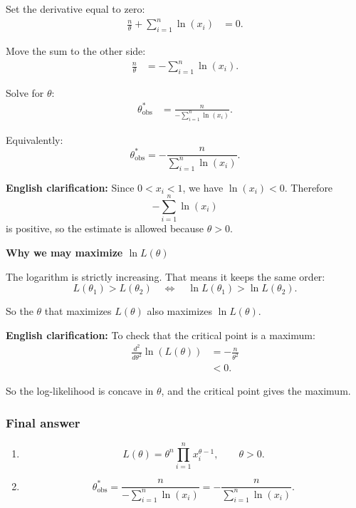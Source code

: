 \documentclass[10pt]{article}
\begin{document}
Set the derivative equal to zero:
\begin{align*}
\frac{n}{\theta}
+
\sum_{i=1}^{n}
\ln(x_i)
&=0.
\end{align*}

Move the sum to the other side:
\begin{align*}
\frac{n}{\theta}
&=
-
\sum_{i=1}^{n}
\ln(x_i).
\end{align*}

Solve for \(\theta\):
\begin{align*}
\theta^*_{\text{obs}}
&=
\frac{n}
{
-
\sum_{i=1}^{n}
\ln(x_i)
}.
\end{align*}

Equivalently:
\[
\theta^*_{\text{obs}}
=
-
\frac{n}
{
\sum_{i=1}^{n}
\ln(x_i)
}.
\]

\textbf{English clarification:}
Since \(0<x_i<1\), we have \(\ln(x_i)<0\).
Therefore
\[
-
\sum_{i=1}^{n}\ln(x_i)
\]
is positive, so the estimate is allowed because
\(\theta>0\).

\textbf{Why we may maximize \(\ln L(\theta)\)}

The logarithm is strictly increasing. That means it
keeps the same order:
\[
L(\theta_1)>L(\theta_2)
\quad \Longleftrightarrow \quad
\ln L(\theta_1)>\ln L(\theta_2).
\]

So the \(\theta\) that maximizes \(L(\theta)\) also
maximizes \(\ln L(\theta)\).

\textbf{English clarification:}
To check that the critical point is a maximum:
\begin{align*}
\frac{d^2}{d\theta^2}
\ln(L(\theta))
&=
-
\frac{n}{\theta^2}
\\[2mm]
&<0.
\end{align*}

So the log-likelihood is concave in \(\theta\), and
the critical point gives the maximum.

\subsubsection*{Final answer}

\begin{enumerate}[label=\alph*)]
\item
\[
L(\theta)
=
\theta^n
\prod_{i=1}^{n}
x_i^{\theta-1},
\qquad
\theta>0.
\]

\item
\[
\theta^*_{\text{obs}}
=
\frac{n}
{
-
\sum_{i=1}^{n}
\ln(x_i)
}
=
-
\frac{n}
{
\sum_{i=1}^{n}
\ln(x_i)
}.
\]
\end{enumerate}
\end{document}
